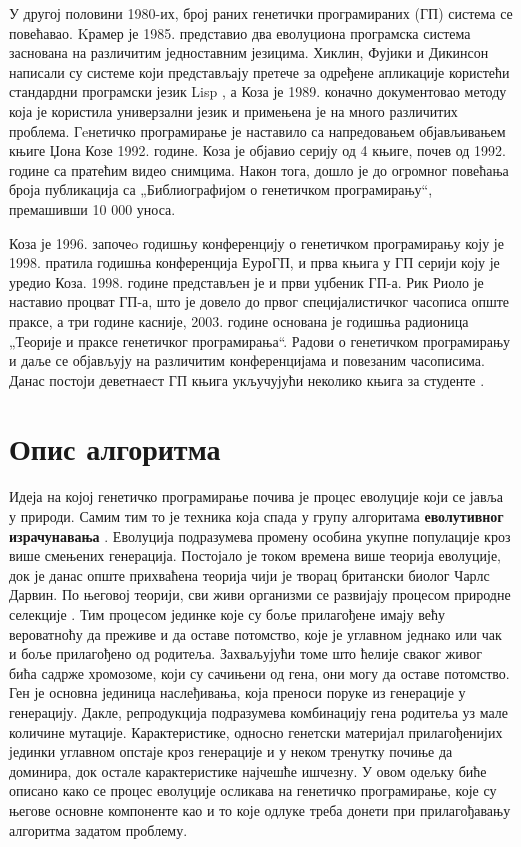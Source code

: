 \documentclass[a4paper]{article}
\begin{document}
У другој половини 1980-их, број раних генетички програмираних (ГП) система се повећавао. Kрамер је 1985. представио два еволуциона програмска система заснована на различитим једноставним језицима. Хиклин, Фујики и Дикинсон написали су системе који представљају претече за одређене апликације користећи стандардни програмски језик Lisp \cite{lisp}, а Коза је 1989. коначно документовао методу која је користила универзални језик и примењена је на много различитих проблема. Гeнетичко програмирање је наставило са напредовањем објављивањем књиге Џона Козе 1992. године. Коза је објавио серију од 4 књиге, почев од 1992. године са пратећим видео снимцима. Након тога, дошло је до огромног повећања броја публикација са „Библиографијом о генетичком програмирању“, премашивши 10 000 уноса.


Коза је 1996. започеo годишњу конференцију о генетичком програмирању  коју је 1998. пратила годишња конференција ЕуроГП, и прва књига у ГП серији коју је уредио Коза. 1998. године представљен је и први уџбеник ГП-а. Рик Риоло је наставио процват ГП-а, што је довело до првог специјалистичког часописа опште праксе, а три године касније, 2003. године основана је годишња радионица „Теорије и праксе генетичког програмирања“. Радови о генетичком програмирању и даље се објављују на различитим конференцијама и повезаним часописима. Данас постоји деветнаест ГП књига укључујући неколико књига за студенте \cite{genetic_algorithms}.


\section{Опис алгоритма}

Идеја на којој генетичко програмирање почива је процес еволуције који се јавља у природи. Самим тим то је техника која спада у групу алгоритама  \textbf{еволутивног израчунавања} \cite{compIntelligence}. Еволуција подразумева промену особина укупне популације кроз више смењених генерација. Постојало је током времена више теорија еволуције, док је данас опште прихваћена теорија чији је творац британски биолог Чарлс Дарвин. По његовој теорији, сви живи организми се развијају процесом природне селекције \cite{darwin1859}. Тим процесом јединке које су боље прилагођене имају већу вероватноћу да преживе и да оставе потомство, које је углавном једнако или чак и боље прилагођено од родитеља. Захваљујући томе што ћелије сваког живог бића садрже хромозоме, који су сачињени од гена, они могу да оставе потомство. Ген је основна јединица наслеђивања, која преноси поруке из генерације у генерацију. Дакле, репродукција подразумева комбинацију гена родитеља уз мале количине мутације. Карактеристике, односно генетски материјал прилагођенијих јединки углавном опстаје кроз генерације и у неком тренутку почиње да доминира, док остале карактеристике најчешће ишчезну. У овом одељку биће описано како се процес еволуције осликава на генетичко програмирање, које су његове основне компоненте као и то које одлуке треба донети при прилагођавању алгоритма задатом проблему.
\end{document}
